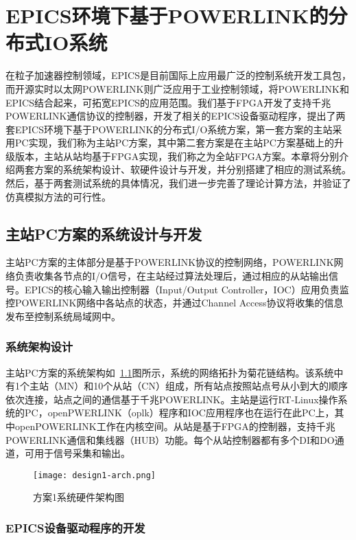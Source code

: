 
\chapter{EPICS环境下基于POWERLINK的分布式IO系统}

在粒子加速器控制领域，EPICS是目前国际上应用最广泛的控制系统开发工具包，而开源实时以太网POWERLINK则广泛应用于工业控制领域，将POWERLINK和EPICS结合起来，可拓宽EPICS的应用范围。我们基于FPGA开发了支持千兆POWERLINK通信协议的控制器，开发了相关的EPICS设备驱动程序，提出了两套EPICS环境下基于POWERLINK的分布式I/O系统方案，第一套方案的主站采用PC实现，我们称为主站PC方案，其中第二套方案是在主站PC方案基础上的升级版本，主站从站均基于FPGA实现，我们称之为全站FPGA方案。本章将分别介绍两套方案的系统架构设计、软硬件设计与开发，并分别搭建了相应的测试系统。然后，基于两套测试系统的具体情况，我们进一步完善了理论计算方法，并验证了仿真模拟方法的可行性。

\section{主站PC方案的系统设计与开发}
\label{section:主站PC方案的系统设计与开发}
主站PC方案的主体部分是基于POWERLINK协议的控制网络，POWERLINK网络负责收集各节点的I/O信号，在主站经过算法处理后，通过相应的从站输出信号。EPICS的核心输入输出控制器（Input/Output Controller，IOC）应用负责监控POWERLINK网络中各站点的状态，并通过Channel Access协议将收集的信息发布至控制系统局域网中。

\subsection{系统架构设计}
\label{subsection:主站PC方案的系统架构设计}
主站PC方案的系统架构如~\ref{fig:design1-arch}图所示，系统的网络拓扑为菊花链结构。该系统中有1个主站（MN）和10个从站（CN）组成，所有站点按照站点号从小到大的顺序依次连接，站点之间的通信基于千兆POWERLINK。主站是运行RT-Linux操作系统的PC，openPWERLINK（oplk）程序和IOC应用程序也在运行在此PC上，其中openPOWERLINK工作在内核空间。从站是基于FPGA的控制器，支持千兆POWERLINK通信和集线器（HUB）功能。每个从站控制器都有多个DI和DO通道，可用于信号采集和输出\cite{xksun-2019}。

\begin{figure}[!htb]
  \centering
  \texttt{[image: design1-arch.png]}
  \caption{方案1系统硬件架构图}
  \label{fig:design1-arch}
\end{figure}

\subsection{EPICS设备驱动程序的开发}

